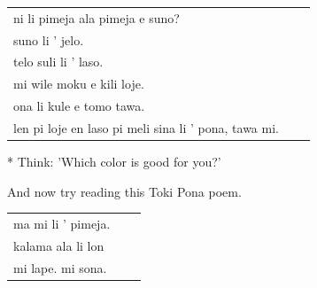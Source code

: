 \begin{supertabular}{p{5,5cm}|ll}
ni li pimeja ala pimeja e suno?  &&   \\ %
suno li ' jelo. &&   \\ %
telo suli li ' laso.  &&  \\ %
mi wile moku e kili loje.  &&  \\ %
ona li kule e tomo tawa. &&   \\ %
len pi loje en laso pi meli sina li ' pona, tawa mi.  &&   \\ %
\end{supertabular} 

* Think: 'Which color is good for you?' 

And now try reading this Toki Pona poem. 

\begin{supertabular}{p{5,5cm}|ll}
ma mi li ' pimeja. && \\ %
kalama ala li lon && \\ %
mi lape. mi sona. && \\ %
\end{supertabular} 

